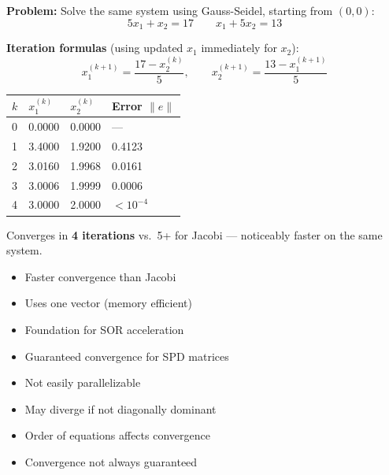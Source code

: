 \documentclass[12pt]{article}
\newcommand{\hcell}[1]{\textbf{\color{white}#1}}
\begin{document}
\bigskip

\begin{examplebox*}
\textbf{Problem:} Solve the same system using Gauss-Seidel, starting from $(0,0)$:
\[
  5x_1 + x_2 = 17 \qquad x_1 + 5x_2 = 13
\]

\textbf{Iteration formulas} (using updated $x_1$ immediately for $x_2$):
\[
  x_1^{(k+1)} = \frac{17 - x_2^{(k)}}{5}, \qquad
  x_2^{(k+1)} = \frac{13 - x_1^{(k+1)}}{5}
\]

\begin{center}{\small
\begin{tabular}{C{1.5cm} C{3cm} C{3cm} C{4cm}}
\toprule
{}
\hcell{$k$} & \hcell{$x_1^{(k)}$} & \hcell{$x_2^{(k)}$} & \hcell{Error $\|e\|$} \\
\midrule
{}
0 & 0.0000 & 0.0000 & --- \\
1 & 3.4000 & 1.9200 & 0.4123 \\
2 & 3.0160 & 1.9968 & 0.0161 \\
3 & 3.0006 & 1.9999 & 0.0006 \\
4 & 3.0000 & 2.0000 & $< 10^{-4}$ \\
\bottomrule
\end{tabular}
}\end{center}
Converges in \textbf{4 iterations} vs.\ 5+ for Jacobi — noticeably faster on the same system.
\end{examplebox*}

\begin{multicols}{2}
\begin{prosbox}
\begin{itemize}[noitemsep]
  \item Faster convergence than Jacobi
  \item Uses one vector (memory efficient)
  \item Foundation for SOR acceleration
  \item Guaranteed convergence for SPD matrices
\end{itemize}
\end{prosbox}

\columnbreak

\begin{consbox}
\begin{itemize}[noitemsep]
  \item Not easily parallelizable
  \item May diverge if not diagonally dominant
  \item Order of equations affects convergence
  \item Convergence not always guaranteed
\end{itemize}
\end{consbox}
\end{multicols}
\end{document}
